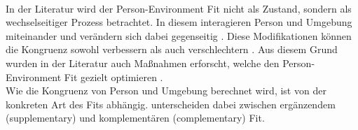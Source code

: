 \\
In der Literatur wird der Person-Environment Fit nicht als Zustand, sondern als wechselseitiger Prozess betrachtet. In diesem interagieren Person und Umgebung miteinander und verändern sich dabei gegenseitig \cite[S. 21f.]{roberts:2006}. Diese Modifikationen können die Kongruenz sowohl verbessern als auch verschlechtern \cite[S. 4]{caplan:1987}. Aus diesem Grund wurden in der Literatur auch Maßnahmen erforscht, welche den Person-Environment Fit gezielt optimieren \cite[S. 16]{cable:2001}.\\
Wie die Kongruenz von Person und Umgebung berechnet wird, ist von der konkreten Art des Fits abhängig. \textcite[S. 1]{muchinsky:1987} unterscheiden dabei zwischen ergänzendem (supplementary) und komplementären (complementary) Fit. \\

